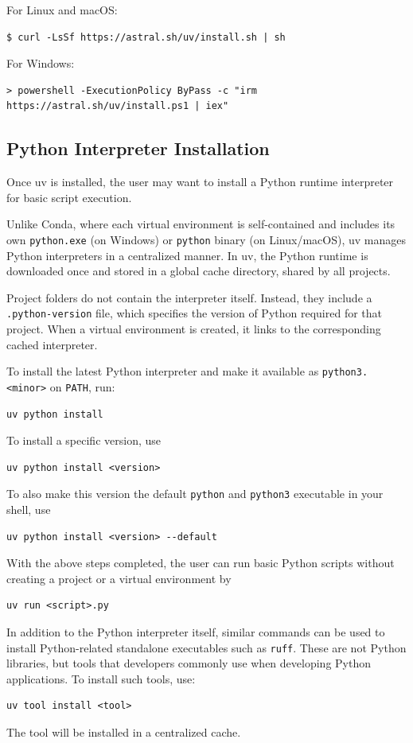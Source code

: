 For Linux and macOS:
\begin{lstlisting}
$ curl -LsSf https://astral.sh/uv/install.sh | sh
\end{lstlisting}

For Windows:
\begin{lstlisting}
> powershell -ExecutionPolicy ByPass -c "irm https://astral.sh/uv/install.ps1 | iex"
\end{lstlisting}

\subsection{Python Interpreter Installation}

Once uv is installed, the user may want to install a Python runtime interpreter for basic script execution.

Unlike Conda, where each virtual environment is self-contained and includes its own \verb|python.exe| (on Windows) or \verb|python| binary (on Linux/macOS), uv manages Python interpreters in a centralized manner. In uv, the Python runtime is downloaded once and stored in a global cache directory, shared by all projects.

Project folders do not contain the interpreter itself. Instead, they include a \verb|.python-version| file, which specifies the version of Python required for that project. When a virtual environment is created, it links to the corresponding cached interpreter.

To install the latest Python interpreter and make it available as \verb|python3.<minor>| on \texttt{PATH}, run:
\begin{lstlisting}
uv python install
\end{lstlisting}
To install a specific version, use
\begin{lstlisting}
uv python install <version>
\end{lstlisting}
To also make this version the default \verb|python| and \verb|python3| executable in your shell, use
\begin{lstlisting}
uv python install <version> --default
\end{lstlisting}

With the above steps completed, the user can run basic Python scripts without creating a project or a virtual environment by
\begin{lstlisting}
uv run <script>.py
\end{lstlisting}

In addition to the Python interpreter itself, similar commands can be used to install Python-related standalone executables such as \verb|ruff|. These are not Python libraries, but tools that developers commonly use when developing Python applications. To install such tools, use:
\begin{lstlisting}
uv tool install <tool>
\end{lstlisting}
The tool will be installed in a centralized cache.

